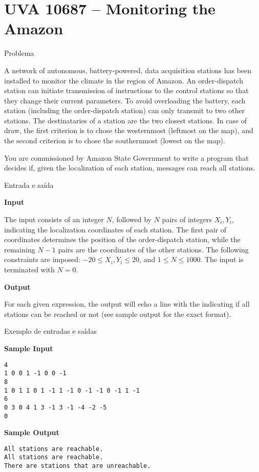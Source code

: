 \section{UVA 10687 -- Monitoring the Amazon}

\begin{frame}[fragile]{Problema}

A network of autonomous, battery-powered, data acquisition stations has been installed to monitor 
the climate in the region of Amazon. An order-dispatch station can initiate transmission of 
instructions to the control stations so that they change their current parameters. To avoid 
overloading the battery, each station (including the order-dispatch station) can only transmit to 
two other stations. The destinataries of a station are the two closest stations. In case of draw, 
the first criterion is to chose the westernmost (leftmost on the map), and the second criterion is 
to chose the southernmost (lowest on the map).

You are commissioned by Amazon State Government to write a program that decides if, given the
localization of each station, messages can reach all stations.

\end{frame}

\begin{frame}[fragile]{Entrada e saída}

\textbf{Input}

The input consists of an integer $N$, followed by $N$ pairs of integers $X_i, Y_i$, indicating the 
localization coordinates of each station. The first pair of coordinates determines the position of 
the order-dispatch station, while the remaining $N - 1$ pairs are the coordinates of the other 
stations. The following constraints are imposed: $-20\leq X_i, Y_i\leq 20$, and $1\leq N\leq 1000$.
The input is terminated with $N = 0$.

\textbf{Output}

For each given expression, the output will echo a line with the indicating if all stations can be 
reached or not (see sample output for the exact format).

\end{frame}


\begin{frame}[fragile]{Exemplo de entradas e saídas}
\begin{footnotesize}
\begin{minipage}[t]{0.55\textwidth}
\textbf{Sample Input}
\begin{verbatim}
4
1 0 0 1 -1 0 0 -1
8
1 0 1 1 0 1 -1 1 -1 0 -1 -1 0 -1 1 -1
6
0 3 0 4 1 3 -1 3 -1 -4 -2 -5
0
\end{verbatim}
\end{minipage}
\begin{minipage}[t]{0.4\textwidth}
\textbf{Sample Output}
\begin{verbatim}
All stations are reachable.
All stations are reachable.
There are stations that are unreachable.
\end{verbatim}
\end{minipage}
\end{footnotesize}
\end{frame}


